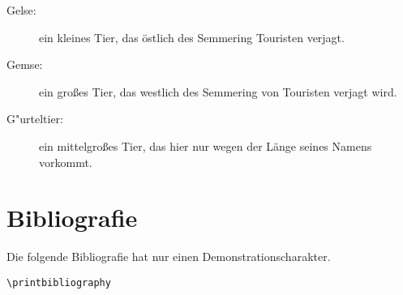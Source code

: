 \documentclass[ngerman]{dtk}
\begin{document}
\begin{description}
\item[Gelse:]
   ein kleines Tier, das
   östlich des Semmering Touristen verjagt.
\item[Gemse:]
   ein großes Tier, das
   westlich des Semmering von Touristen verjagt wird.
\item[G"urteltier:]
   ein mittelgroßes Tier, das
   hier nur wegen der Länge seines Namens vorkommt.
\end{description}

\section{Bibliografie}
Die folgende Bibliografie hat nur einen 
Demonstrationscharakter.

\begin{lstlisting}[style=number]
\printbibliography
\end{lstlisting}

\nocite{*}
\printbibliography
\end{document}
